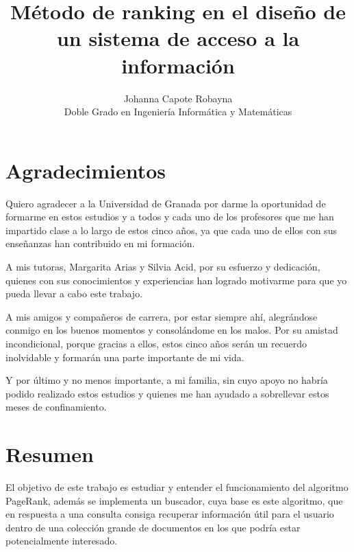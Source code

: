 \documentclass[size=a4, parskip=half, titlepage=false, toc=flat, toc=bib, 12pt, twoside]{scrartcl}
\title{Método de ranking en el diseño de un sistema de acceso a la información}
\author{Johanna Capote Robayna\\
    Doble Grado en Ingeniería Informática y Matemáticas}
\date{}
\theoremstyle{theorem-style}
\theoremstyle{definition-style}
\theoremstyle{remark-style}
\theoremstyle{example-style}
\theoremstyle{definition-style}
\theoremstyle{remark-style}
\begin{document}
\maketitle
\thispagestyle{empty}

\newpage
\thispagestyle{empty}
\afterpage{\null\newpage}

\newpage
\section*{Agradecimientos}
\thispagestyle{empty}

\vspace{1cm}

Quiero agradecer a la Universidad de Granada por darme la oportunidad de formarme en estos estudios y a todos y cada uno de los profesores que me han impartido clase a lo largo de estos cinco años, ya que cada uno de ellos con sus enseñanzas han contribuido en mi formación.

A mis tutoras, Margarita Arias y Silvia Acid, por su esfuerzo y dedicación, quienes con sus conocimientos y experiencias han logrado motivarme para que yo pueda llevar a cabo este trabajo.

A mis amigos y compañeros de carrera, por estar siempre ahí, alegrándose conmigo en los buenos momentos y consolándome en los malos. Por su amistad incondicional, porque gracias a ellos, estos cinco años serán un recuerdo inolvidable y formarán una parte importante de mi vida.

Y por último y no menos importante, a mi familia, sin cuyo apoyo no habría podido realizado estos estudios y quienes me han ayudado a sobrellevar estos meses de confinamiento.

\newpage
\thispagestyle{empty}
\afterpage{\null\newpage}

\newpage

\pagestyle{empty}
\tableofcontents
\clearpage
\pagestyle{headings}
\newpage

\section{Resumen}
El objetivo de este trabajo es estudiar y entender el funcionamiento del algoritmo PageRank, además se implementa un buscador, cuya base es este algoritmo, que en respuesta a una consulta consiga recuperar información útil para el usuario dentro de una colección grande de documentos en los que podría estar potencialmente interesado.
\end{document}
